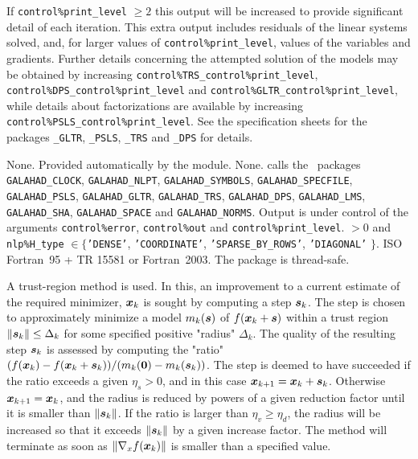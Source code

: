 \documentclass{galahad}
\newcommand{\packagename}{TRU}
\begin{document}
If {\tt control\%print\_level} $\geq 2$ this
output will be increased to provide significant detail of each iteration.
This extra output includes residuals of the linear systems solved, and,
for larger values of {\tt control\%print\_level}, values of the variables
and gradients. Further details concerning the attempted solution of the models
may be obtained by increasing
{\tt control\%TRS\_control\%print\_level},
{\tt control\%DPS\_control\%print\_level}
and
{\tt control\%GLTR\_control\%print\_level},
while details about factorizations are available
by increasing
{\tt control\%PSLS\_control\%print\_level}.
See the specification sheets for the packages
{\tt \libraryname\_GLTR},
{\tt \libraryname\_PSLS},
{\tt \libraryname\_TRS} and
{\tt \libraryname\_DPS}
for details.


\galgeneral

\galcommon None.
\galworkspace Provided automatically by the module.
\galroutines None.
\galmodules {\tt \packagename\_solve} calls the \galahad\ packages
{\tt GALAHAD\_CLOCK},
{\tt GALAHAD\_NLPT},
{\tt GALAHAD\_SY\-M\-BOLS}, \sloppy
{\tt GALAHAD\_SPECFILE},
{\tt GALAHAD\_PSLS},
{\tt GALAHAD\_GLTR},
{\tt GALAHAD\_TRS},
{\tt GALAHAD\_DPS},
{\tt GALAHAD\_LMS},
{\tt GALAHAD\_SHA},
{\tt GALAHAD\_SPACE} and
{\tt GALAHAD\_NORMS}.
\galio Output is under control of the arguments
 {\tt control\%error}, {\tt control\%out} and {\tt control\%print\_level}.
 $> 0$ and
{\tt nlp\%H\_type} $\in \{${\tt 'DENSE'},
 {\tt 'COORDINATE'}, {\tt 'SPARSE\_BY\_ROWS'}, {\tt 'DIAGONAL'} $\}$.
\galportability ISO Fortran~95 + TR 15581 or Fortran~2003.
The package is thread-safe.


\galmethod
A trust-region method is used. In this, an improvement to a current
estimate of the required minimizer, ${\bm{x}}_k$ is sought by computing a
step ${\bm{s}}_k$. The step is chosen to approximately minimize a model $m_k({\bm{s}})$
of $f({\bm{x}}_k + {\bm{s}})$ within a trust region $\|{\bm{s}}_k\| \leq \Delta_k$
for some specified positive "radius" $\Delta_k$. The quality of the
resulting step ${\bm{s}}_k$ is assessed by computing the "ratio"
$(f({\bm{x}}_k) - f({\bm{x}}_k + {\bm{s}}_k))/ (m_k({\bm{0}}) - m_k({\bm{s}}_k))$.
The step is deemed to have succeeded if the ratio exceeds a given $\eta_s > 0$,
and in this case ${\bm{x}}_{k+1} = {\bm{x}}_k + {\bm{s}}_k$. Otherwise
${\bm{x}}_{k+1} = {\bm{x}}_k$, and the radius is reduced by powers of a given
reduction factor until it is smaller than $\|{\bm{s}}_k\|$. If the ratio
is larger than  $\eta_v \geq \eta_d$, the radius will be increased so that
it exceeds $\|{\bm{s}}_k\|$ by a given increase factor. The method will terminate
as soon as $\|\nabla_x f({\bm{x}}_k)\|$ is smaller than a specified value.
\end{document}
